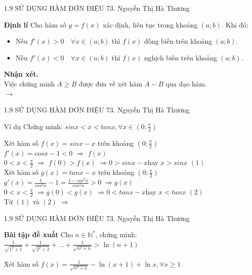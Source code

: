 \begin{frame}{1.9 SỬ DỤNG HÀM ĐƠN ĐIỆU\hspace{2cm}  73. Nguyễn Thị Hà Thương} 
\begin{block}{\textbf{Định lí}}
Cho hàm số $y=f(x)$ xác định, liên tục trong khoảng $(a;b)$. Khi đó:\\
\begin{itemize}
    \item Nếu $f'(x)>0 \quad \forall x \in (a;b)$ thì $f(x)$ đồng biến trên khoảng $(a;b)$.
    \item Nếu $f'(x)<0 \quad \forall x \in (a;b)$ thì $f(x)$ nghịch biến trên khoảng $(a;b)$.
\end{itemize}
    
\end{block} 
\pause
\textbf{Nhận xét.}\\
Việc chứng minh $A \geq B$ được đưa về xét hàm $A-B$ qua đạo hàm.\\
$\rightarrow$ 
\end{frame} 

\begin{frame}{1.9 SỬ DỤNG HÀM ĐƠN ĐIỆU\hspace{2cm}  73. Nguyễn Thị Hà Thương} 
\begin{block}{Ví dụ}
Chứng minh: $sinx<x<tanx, \forall x\in (0;\frac{\pi}{2})$
\end{block}
\pause

Xét hàm số $f(x)=sinx-x$ trên khoảng $(0;\frac{\pi}{2})$\\
$f'(x)=cosx-1 < 0$ $\Rightarrow$ {$f(x)$ \quad {}}\\
$0<x<\frac{\pi}{2}$ $\Rightarrow$ {$f(0) > f(x)$} \quad $\Rightarrow${$0 > sinx - x$}\quad hay \quad $x > sinx$ \quad $(1)$\\
\pause
Xét hàm số $g(x)=tanx-x$ trên khoảng $(0;\frac{\pi}{2})$\\
$g'(x)=\frac{1}{cos^2x}-1=\frac{1-cos^2x}{cos^2x} > 0$ $\Rightarrow${$g(x)$ \quad {}}\\
$0<x<\frac{\pi}{2}$ $\Rightarrow${$g(0) < g(x)$} \quad $\Rightarrow${$0 < tanx - x$}\quad hay \quad $x < tanx$ \quad $(2)$\\

\indent Từ $(1)$ và $(2)$ $\Rightarrow${}
\end{frame} 

\begin{frame}{1.9 SỬ DỤNG HÀM ĐƠN ĐIỆU\hspace{2cm}  73. Nguyễn Thị Hà Thương} 
\begin{block}{\textbf{Bài tập đề xuất}}
\large Cho $n\in\mathbb{N}^*$, chứng minh:\\
\centering \large $\frac{1}{\sqrt{1^2+1}}+\frac{1}{\sqrt{2^2+2}}+...+\frac{1}{\sqrt{n^2+n}}>\ln{(n+1)}$
\end{block}

\pause
\large Xét hàm số $f(x)=\frac{1}{\sqrt{x^2+x}}-\ln{(x+1)}+\ln{x}, \forall x \geq 1$
\end{frame} 

